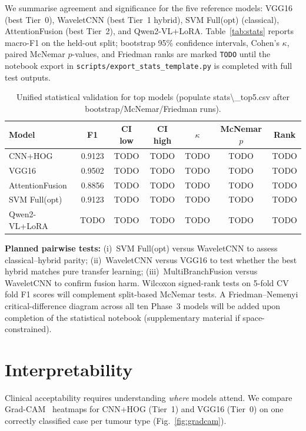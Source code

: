 \documentclass[11pt]{article}
\begin{document}
We summarise agreement and significance for the five reference models: VGG16 (best Tier~0), WaveletCNN (best Tier~1 hybrid), SVM Full(opt) (classical), AttentionFusion (best Tier~2), and Qwen2-VL+LoRA.
Table~\ref{tab:stats} reports macro-F1 on the held-out split; bootstrap 95\% confidence intervals, Cohen's $\kappa$, paired McNemar $p$-values, and Friedman ranks are marked \texttt{TODO} until the notebook export in \texttt{scripts/export\_stats\_template.py} is completed with full test outputs.

\begin{table}
\centering
\caption{Unified statistical validation for top models (populate stats\textbackslash{}\_top5.csv after bootstrap/McNemar/Friedman runs).}

\begin{tabular}{@{}lcccccc@{}}
\hline
Model & F1 & CI low & CI high & $\kappa$ & McNemar $p$ & Rank \\
\hline
CNN+HOG & 0.9123 & TODO & TODO & TODO & TODO & TODO \\
VGG16 & 0.9502 & TODO & TODO & TODO & TODO & TODO \\
AttentionFusion & 0.8856 & TODO & TODO & TODO & TODO & TODO \\
SVM Full(opt) & 0.9123 & TODO & TODO & TODO & TODO & TODO \\
Qwen2-VL+LoRA & TODO & TODO & TODO & TODO & TODO & TODO \\
\hline
\end{tabular}
\end{table}


\textbf{Planned pairwise tests:}
(i)~SVM Full(opt) versus WaveletCNN to assess classical--hybrid parity;
(ii)~WaveletCNN versus VGG16 to test whether the best hybrid matches pure transfer learning;
(iii)~MultiBranchFusion versus WaveletCNN to confirm fusion harm.
Wilcoxon signed-rank tests on 5-fold CV fold F1 scores will complement split-based McNemar tests.
A Friedman--Nemenyi critical-difference diagram across all ten Phase~3 models will be added upon completion of the statistical notebook (supplementary material if space-constrained).

\section{Interpretability}


Clinical acceptability requires understanding \emph{where} models attend.
We compare Grad-CAM~\cite{ref79_access20182870052} heatmaps for CNN+HOG (Tier~1) and VGG16 (Tier~0) on one correctly classified case per tumour type (Fig.~\ref{fig:gradcam}).
\end{document}
